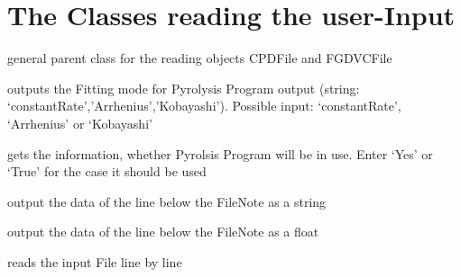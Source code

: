 \documentclass[letterpaper,10pt,english]{sphinxmanual}
\begin{document}
\section{The Classes reading the user-Input}
\label{FittingClasses:the-classes-reading-the-user-input}

\begin{fulllineitems}
\label{FittingClasses:ReadInputFiles.ReadFile}
general parent class for the reading objects CPDFile and FGDVCFile

\begin{fulllineitems}
\label{FittingClasses:ReadInputFiles.ReadFile.Fitting}
outputs the Fitting mode for Pyrolysis Program output (string: `constantRate','Arrhenius','Kobayashi'). Possible input: `constantRate', `Arrhenius' or `Kobayashi'

\end{fulllineitems}


\begin{fulllineitems}
\label{FittingClasses:ReadInputFiles.ReadFile.UsePyrolProgr}
gets the information, whether Pyrolsis Program will be in use. Enter `Yes' or `True' for the case it should be used

\end{fulllineitems}


\begin{fulllineitems}
\label{FittingClasses:ReadInputFiles.ReadFile.getText}
output the data of the line below the FileNote as a string

\end{fulllineitems}


\begin{fulllineitems}
\label{FittingClasses:ReadInputFiles.ReadFile.getValue}
output the data of the line below the FileNote as a float

\end{fulllineitems}


\begin{fulllineitems}
\label{FittingClasses:ReadInputFiles.ReadFile.readLines}
reads the input File line by line

\end{fulllineitems}


\end{fulllineitems}
\end{document}
